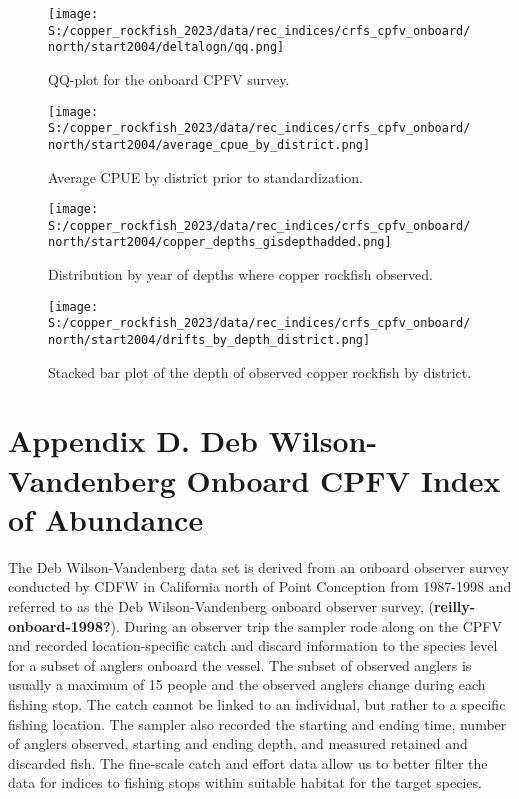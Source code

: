 \documentclass[11pt,
  english,
  letterpaper,
]{article}
\begin{document}
\newpage

\begin{figure}
\centering
\texttt{[image: S:/copper\_rockfish\_2023/data/rec\_indices/crfs\_cpfv\_onboard/north/start2004/deltalogn/qq.png]}
\caption{QQ-plot for the onboard CPFV survey.\label{fig:onboard-qq}}
\end{figure}

\newpage

\begin{figure}
\centering
\texttt{[image: S:/copper\_rockfish\_2023/data/rec\_indices/crfs\_cpfv\_onboard/north/start2004/average\_cpue\_by\_district.png]}
\caption{Average CPUE by district prior to standardization.\label{fig:onboard-regioncpue}}
\end{figure}

\newpage

\begin{figure}
\centering
\texttt{[image: S:/copper\_rockfish\_2023/data/rec\_indices/crfs\_cpfv\_onboard/north/start2004/copper\_depths\_gisdepthadded.png]}
\caption{Distribution by year of depths where copper rockfish observed.\label{fig:onboard-depths}}
\end{figure}

\newpage

\begin{figure}
\centering
\texttt{[image: S:/copper\_rockfish\_2023/data/rec\_indices/crfs\_cpfv\_onboard/north/start2004/drifts\_by\_depth\_district.png]}
\caption{Stacked bar plot of the depth of observed copper rockfish by district.\label{fig:onboard-depths}}
\end{figure}

\newpage

\hypertarget{dwv-cpfv-index}{%
\section{Appendix D. Deb Wilson-Vandenberg Onboard CPFV Index of Abundance}\label{dwv-cpfv-index}}

The Deb Wilson-Vandenberg data set is derived from an onboard observer survey conducted by CDFW in California north of Point Conception from 1987-1998 and referred to as the Deb Wilson-Vandenberg onboard observer survey, (\textbf{reilly-onboard-1998?}). During an observer trip the sampler rode along on the CPFV and recorded location-specific catch and discard information to the species level for a subset of anglers onboard the vessel. The subset of observed anglers is usually a maximum of 15 people and the observed anglers change during each fishing stop. The catch cannot be linked to an individual, but rather to a specific fishing location. The sampler also recorded the starting and ending time, number of anglers observed, starting and ending depth, and measured retained and discarded fish. The fine-scale catch and effort data allow us to better filter the data for indices to fishing stops within suitable habitat for the target species.
\end{document}
